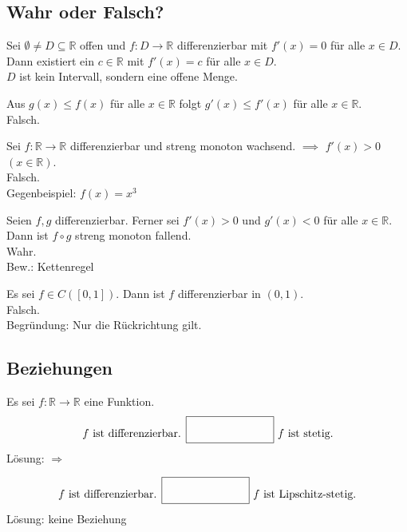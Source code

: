 \subsection{Wahr oder Falsch?}
Sei $\emptyset \neq D \subseteq \mathbb{R}$ offen und $f:D \to \mathbb{R}$ differenzierbar mit $f'(x) = 0$ für alle $x \in D$. 
Dann existiert ein $c \in \mathbb{R}$ mit $f'(x) = c$ für alle $x \in D$.\\
$D$ ist kein Intervall, sondern eine offene Menge.

Aus $g(x) \leq f(x)$ für alle $x \in \mathbb{R}$ folgt $g'(x) \leq f'(x)$ für alle $x \in \mathbb{R}$.\\
Falsch.

Sei $f: \mathbb{R} \to \mathbb{R}$ differenzierbar und streng monoton wachsend. $\implies$ $f'(x) > 0$ $(x \in \mathbb{R})$.\\
Falsch.\\
Gegenbeispiel: $f(x) = x^3$

Seien $f,g$ differenzierbar.
Ferner sei $f'(x) > 0$ und $g'(x) < 0$ für alle $x \in \mathbb{R}$.
Dann ist $f \circ g$ streng monoton fallend.\\
Wahr.\\
Bew.: Kettenregel

Es sei $f \in C([0,1])$.
Dann ist $f$ differenzierbar in $(0,1)$.\\
Falsch.\\
Begründung: Nur die Rückrichtung gilt.

\subsection{Beziehungen}
Es sei $f: \mathbb{R} \to \mathbb{R}$ eine Funktion.
\begin{displaymath}
  f \text{ ist differenzierbar. } \fbox{\rule{1in}{0pt}\rule[-0.5ex]{0pt}{4ex}} \text{ $f$ ist stetig.}
\end{displaymath}
Lösung: $\Rightarrow$

\begin{displaymath}
  f \text{ ist differenzierbar. } \fbox{\rule{1in}{0pt}\rule[-0.5ex]{0pt}{4ex}} \text{ $f$ ist Lipschitz-stetig.}
\end{displaymath}
Lösung: keine Beziehung